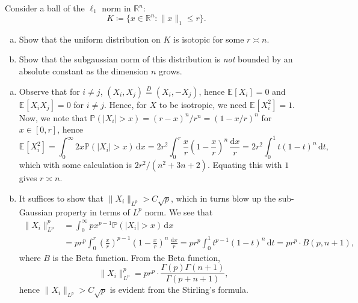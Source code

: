 \begin{problem*}[Exercise 3.4.9]\label{ex3.4.9}
	Consider a ball of the \(\ell _1\) norm in \(\mathbb{R} ^n\):
	\[
		K
		\coloneqq \{ x \in \mathbb{R} ^n \colon \lVert x \rVert _1 \leq r \}.
	\]
	\begin{enumerate}[(a)]
		\item\label{ex3.4.9:a} Show that the uniform distribution on \(K\) is isotopic for some \(r \asymp n\).
		\item\label{ex3.4.9:b} Show that the subgaussian norm of this distribution is \emph{not} bounded by an absolute constant as the dimension \(n\) grows.
	\end{enumerate}
\end{problem*}
\begin{answer}
	\begin{enumerate}[(a)]
		\item Observe that for \(i \neq j\), \((X_i, X_j) \overset{D}{=} (X_i, -X_j)\), hence \(\mathbb{E}_{}[X_i] = 0\) and \(\mathbb{E}_{}[X_i X_j] = 0\) for \(i \neq j\). Hence, for \(X\) to be isotropic, we need \(\mathbb{E}_{}[X_i^2] = 1\). Now, we note that \(\mathbb{P} (\vert X_i \vert > x) = (r-x)^n / r^n = (1 - x / r)^n\) for \(x \in [0, r]\), hence
		      \[
			      \mathbb{E}_{}[X_i^2]
			      = \int_{0}^{\infty} 2x \mathbb{P} (\vert X_i \vert > x) \,\mathrm{d}x
			      = 2r^2 \int_{0}^{r} \frac{x}{r} \left( 1 - \frac{x}{r} \right)^n \,\frac{\mathrm{d}x }{r}
			      = 2r^2 \int_{0}^{1} t (1 - t)^n \,\mathrm{d}t,
		      \]
		      which with some calculation is \(2r^2 / (n^2 + 3n +2)\). Equating this with \(1\) gives \(r \asymp n\).
		\item It suffices to show that \(\lVert X_i \rVert _{L^p} > C \sqrt{p} \), which in turns blow up the sub-Gaussian property in terms of \(L^p\) norm. We see that
		      \[
			      \begin{split}
				      \lVert X_i \rVert _{L^p}^p
				       & = \int_{0}^{\infty} p x^{p-1} \mathbb{P} (\vert X_i \vert > x) \,\mathrm{d}x                                     \\
				       & = p r^p \int_{0}^{r} \left( \frac{x}{r} \right) ^{p-1} \left( 1 - \frac{x}{r} \right)^n \,\frac{\mathrm{d}x }{r}
				      = p r^p \int_{0}^{1} t^{p-1} (1 - t)^n \,\mathrm{d}t
				      = p r^p \cdot B(p, n+1),
			      \end{split}
		      \]
		      where \(B\) is the Beta function. From the Beta function,
		      \[
			      \lVert X_i \rVert _{L^p}^p
			      = p r^p \cdot \frac{\Gamma (p) \Gamma (n+1)}{\Gamma (p + n + 1)},
		      \]
		      hence \(\lVert X_i \rVert _{L^p} > C \sqrt{p} \) is evident from the Stirling's formula.
	\end{enumerate}
\end{answer}

